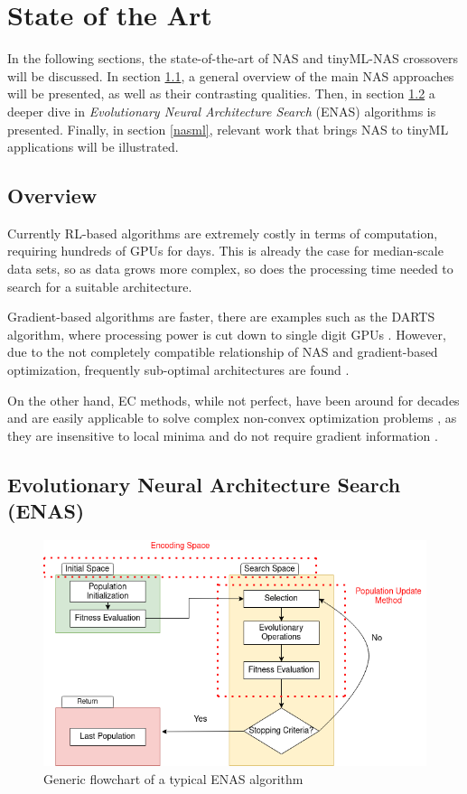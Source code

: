 \documentclass[10pt,        %
               a4paper,     %
               journal,     %
               ]{IEEEtran}
\begin{document}
\section{State of the Art}
\label{SOA}

In the following sections, the state-of-the-art of NAS and tinyML-NAS crossovers will be discussed. In
section \ref{OV}, a general overview of the main NAS approaches will be presented, as well as their contrasting qualities.
Then, in section \ref{EV} a deeper dive in \textit{Evolutionary Neural Architecture Search} (ENAS) algorithms is presented. Finally, in
section \ref{nasml}, relevant work that brings NAS to tinyML applications will be illustrated.

\subsection{Overview}
\label{OV}
Currently RL-based algorithms are extremely costly in terms of computation, requiring hundreds of
GPUs for days. This is already the case for median-scale data sets, so as
data grows more complex, so does the processing time needed to search for a suitable architecture.

Gradient-based algorithms are faster, there are examples such as the DARTS algorithm, where processing power
is cut down to single digit GPUs \cite{liu2018darts}. However, due to the not completely compatible relationship
of NAS and gradient-based optimization, frequently sub-optimal architectures are found \cite{liu2021survey}.

On the other hand, EC methods, while not perfect, have been around for decades and are easily applicable
to solve complex non-convex optimization problems \cite{sun2018igd}, as they are insensitive to local minima
and do not require gradient information \cite{liu2021survey}.

\subsection{Evolutionary Neural Architecture Search (ENAS)}
\label{EV}

\begin{figure}[!h]
    \centering
    \includegraphics[scale=0.4]{evol}
    \caption{Generic flowchart of a typical ENAS algorithm}
    \label{evol}
\end{figure}
\end{document}
